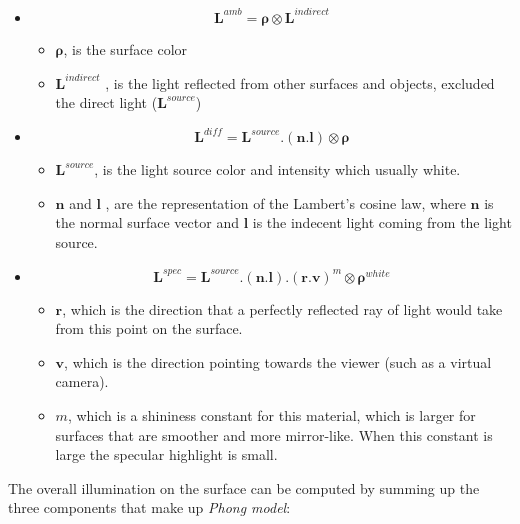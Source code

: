 \documentclass[11pt,a4paper]{article}
\begin{document}
	\begin{itemize}
		\item {}
		\begin{equation}
			\pmb{L}^{amb} = \pmb{\rho}\otimes \pmb{L}^{indirect}
		\end{equation}
		\left 
		\begin{itemize}
			\item $\pmb{\rho}$, is the surface color
			\item $\pmb{L}^{indirect}$ , is the light reflected from other surfaces and objects, excluded the direct light ($\pmb{L}^{source}$)
		\end{itemize}
		\item {} 
		
		\begin{equation}
			\pmb{L}^{diff} =  \pmb{L}^{source}.(\pmb{n}.\pmb{l}) \otimes \pmb{\rho} 
		\end{equation}
		\begin{itemize}
			\item $\pmb{L}^{source}$, is the light source color and intensity which usually white. 
			\item $\pmb{n}$ and $\pmb{l}$ , are the representation of the Lambert's cosine law, where $\pmb{n}$ is the normal surface vector  and $\pmb{l}$ is the indecent light coming from the light source.
		\end{itemize}
		\item {} 
		
		\begin{equation}
			\pmb{L}^{spec} =  \pmb{L}^{source}.(\pmb{n}.\pmb{l}).(\pmb{r}.\pmb{v})^m \otimes \pmb{\rho}^{white} 
		\end{equation}
		\begin{itemize}
			\item $\pmb{r}$, which is the direction that a perfectly reflected ray of light would take from this point on the surface. 
			\item $\pmb{v}$, which is the direction pointing towards the viewer (such as a virtual camera).
			\item $m$, which is a shininess constant for this material, which is larger for surfaces that are smoother and more mirror-like. When this constant is large the specular highlight is small.
		\end{itemize}
	\end{itemize}
	
	The overall illumination on the surface can be computed by summing up the three components that make up \textit{Phong model}:
	
\end{document}
